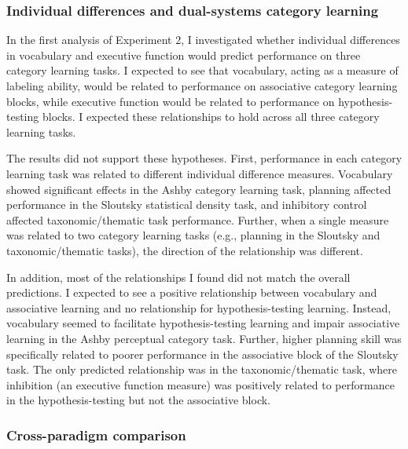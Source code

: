 \documentclass[../dissertation.tex]{subfiles}
\begin{document}
\subsubsection{Individual differences and dual-systems category learning}

	In the first analysis of Experiment 2, I investigated whether individual differences in vocabulary and executive function would predict performance on three category learning tasks. I expected to see that vocabulary, acting as a measure of labeling ability, would be related to performance on associative category learning blocks, while executive function would be related to performance on hypothesis-testing blocks. I expected these relationships to hold across all three category learning tasks. \par
	The results did not support these hypotheses. First, performance in each category learning task was related to different individual difference measures. Vocabulary showed significant effects in the Ashby category learning task, planning affected performance in the Sloutsky statistical density task, and inhibitory control affected taxonomic/thematic task performance. Further, when a single measure was related to two category learning tasks (e.g., planning in the Sloutsky and taxonomic/thematic tasks), the direction of the relationship was different. \par 
	In addition, most of the relationships I found did not match the overall predictions. I expected to see a positive relationship between vocabulary and associative learning and no relationship for hypothesis-testing learning. Instead, vocabulary seemed to facilitate hypothesis-testing learning and impair associative learning in the Ashby perceptual category task. Further, higher planning skill was specifically related to poorer performance in the associative block of the Sloutsky task. The only predicted relationship was in the taxonomic/thematic task, where inhibition (an executive function measure) was positively related to performance in the hypothesis-testing but not the associative block.
	
\subsubsection{Cross-paradigm comparison}
\end{document}
